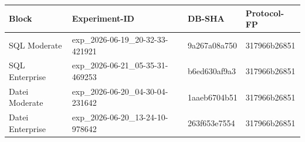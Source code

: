 \begin{tabular}{llll}
\toprule
Block & Experiment-ID & DB-SHA & Protocol-FP \\
\midrule
SQL Moderate & exp\_2026-06-19\_20-32-33-421921 & 9a267a08a750 & 317966b26851 \\
SQL Enterprise & exp\_2026-06-21\_05-35-31-469253 & b6ed630af9a3 & 317966b26851 \\
Datei Moderate & exp\_2026-06-20\_04-30-04-231642 & 1aaeb6704b51 & 317966b26851 \\
Datei Enterprise & exp\_2026-06-20\_13-24-10-978642 & 263f653e7554 & 317966b26851 \\
\bottomrule
\end{tabular}
